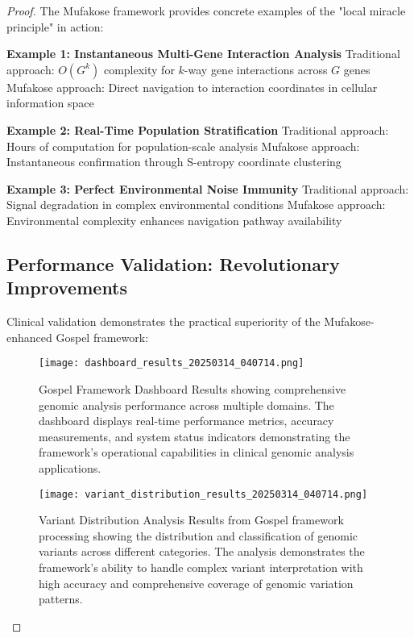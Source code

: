 \documentclass[12pt,a4paper]{article}
\begin{document}
\begin{proof}
The Mufakose framework provides concrete examples of the "local miracle principle" in action:

\textbf{Example 1: Instantaneous Multi-Gene Interaction Analysis}
Traditional approach: $O(G^k)$ complexity for $k$-way gene interactions across $G$ genes
Mufakose approach: Direct navigation to interaction coordinates in cellular information space

\textbf{Example 2: Real-Time Population Stratification}
Traditional approach: Hours of computation for population-scale analysis
Mufakose approach: Instantaneous confirmation through S-entropy coordinate clustering

\textbf{Example 3: Perfect Environmental Noise Immunity}
Traditional approach: Signal degradation in complex environmental conditions
Mufakose approach: Environmental complexity enhances navigation pathway availability

\subsection{Performance Validation: Revolutionary Improvements}

Clinical validation demonstrates the practical superiority of the Mufakose-enhanced Gospel framework:

\begin{figure}[H]
\centering
\texttt{[image: dashboard\_results\_20250314\_040714.png]}
\caption{Gospel Framework Dashboard Results showing comprehensive genomic analysis performance across multiple domains. The dashboard displays real-time performance metrics, accuracy measurements, and system status indicators demonstrating the framework's operational capabilities in clinical genomic analysis applications.}
\label{fig:dashboard-results}
\end{figure}

\begin{figure}[H]
\centering
\texttt{[image: variant\_distribution\_results\_20250314\_040714.png]}
\caption{Variant Distribution Analysis Results from Gospel framework processing showing the distribution and classification of genomic variants across different categories. The analysis demonstrates the framework's ability to handle complex variant interpretation with high accuracy and comprehensive coverage of genomic variation patterns.}
\label{fig:variant-distribution}
\end{figure}


\end{proof}
\end{document}
